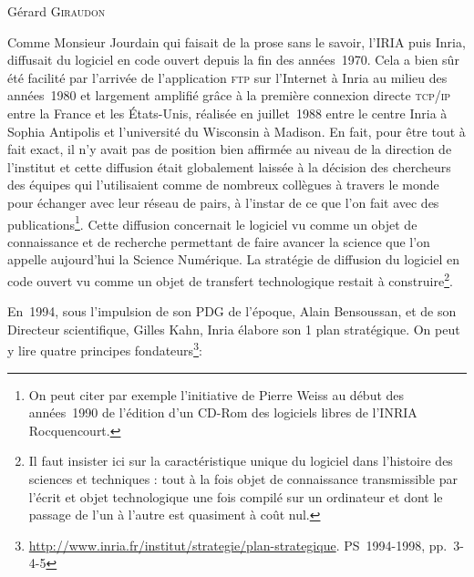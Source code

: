 \documentclass{FramateX}
\begin{document}
\begin{refsection}

\begin{flushright}
Gérard \textsc{Giraudon}
\end{flushright}
\vspace{10 mm}

Comme Monsieur Jourdain qui faisait de la prose sans le savoir, l'IRIA
puis Inria, diffusait du logiciel en code ouvert depuis la fin des
années~1970. Cela a bien sûr été facilité par l'arrivée de
l'application \textsc{ftp} sur l'Internet à Inria au milieu des
années~1980 et largement amplifié grâce à la première connexion directe
\textsc{tcp/ip} entre la France et les États-Unis, réalisée en
juillet~1988 entre le centre Inria à Sophia Antipolis et l'université
du Wisconsin à Madison. En fait, pour être tout à fait exact, il n'y
avait pas de position bien affirmée au niveau de la direction de
l'institut et cette diffusion était globalement laissée à la décision
des chercheurs des équipes qui l'utilisaient comme de nombreux
collègues à travers le monde pour échanger avec leur réseau de pairs, à
l'instar de ce que l'on fait avec des
publications\footnote{On peut citer par
exemple l'initiative de Pierre Weiss au début des années~1990 de
l'édition d'un CD-Rom des logiciels libres de l'INRIA Rocquencourt.}.
Cette diffusion concernait le logiciel vu comme un objet de
connaissance et de recherche permettant de faire avancer la science que
l'on appelle aujourd'hui la Science Numérique. La stratégie de
diffusion du logiciel en code ouvert vu comme un objet de transfert
technologique restait à construire\footnote{Il
faut insister ici sur la caractéristique unique du logiciel dans
l'histoire des sciences et techniques : tout à la fois objet de connaissance transmissible par l'écrit et objet technologique une fois compilé sur un ordinateur et dont le passage de l'un à l'autre est quasiment à coût nul.}.

En~1994, sous l'impulsion de son PDG de l'époque, Alain Bensoussan, et
de son Directeur scientifique, Gilles Kahn, Inria élabore son
1 plan stratégique. On
peut y lire quatre
principes fondateurs\footnote{\url{http://www.inria.fr/institut/strategie/plan-strategique}. PS~1994-1998, pp.~3-4-5}:


\end{refsection}
\end{document}
